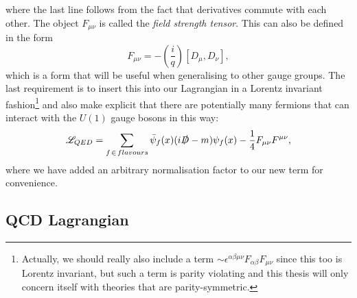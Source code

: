 where the last line follows from the fact that derivatives commute with each other. The object $F_{\mu \nu}$ is called the \emph{field strength tensor}. This can also be defined in the form
\begin{equation}
F_{\mu \nu} = -\left (\frac{i}{q} \right)[D_\mu, D_\nu],
\end{equation}
which is a form that will be useful when generalising to other gauge groups. The last requirement is to insert this into our Lagrangian in a Lorentz invariant fashion\footnote{Actually, we should really also include a term $\sim \epsilon^{\alpha \beta \mu \nu}F_{\alpha \beta} F_{\mu \nu}$ since this too is Lorentz invariant, but such a term is parity violating and this thesis will only concern itself with theories that are parity-symmetric.} and also make explicit that there are potentially many fermions that can interact with the $U(1)$ gauge bosons in this way:
\begin{equation}
\mathscr{L}_{QED} = \sum_{f \hspace{1pt} \in \hspace{1pt} flavours} \bar{\psi}_f(x)(i \slashed{D} - m)\psi_f(x) - \frac{1}{4}F_{\mu \nu}F^{\mu \nu},
\end{equation}
where we have added an arbitrary normalisation factor to our new term for convenience. 

\subsection{QCD Lagrangian} 

